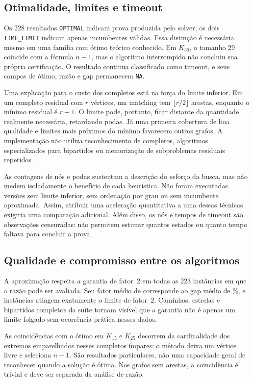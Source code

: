 \subsection{Otimalidade, limites e timeout}

Os 228 resultados \texttt{OPTIMAL} indicam prova produzida pelo
solver; os dois \texttt{TIME\_LIMIT} indicam apenas incumbentes
válidas. Essa distinção é necessária mesmo em uma família
com ótimo teórico conhecido. Em $K_{30}$, o tamanho 29
coincide com a fórmula $n-1$, mas o algoritmo interrompido
não concluiu sua própria certificação. O resultado continua
classificado como timeout, e seus campos de ótimo, razão e
gap permanecem \texttt{NA}.

Uma explicação para o custo dos completos está na força do
limite inferior. Em um completo residual com $r$ vértices,
um matching tem $\lfloor r/2\rfloor$ arestas, enquanto o
mínimo residual é $r-1$. O limite pode, portanto, ficar
distante da quantidade realmente necessária, retardando
podas. Já uma primeira cobertura de boa qualidade e limites
mais próximos do mínimo favorecem outros grafos.
A implementação não utiliza reconhecimento de completos,
algoritmos especializados para bipartidos ou memorização
de subproblemas residuais repetidos.

As contagens de nós e podas sustentam a descrição do esforço
da busca, mas não medem isoladamente o benefício de cada
heurística. Não foram executadas versões sem limite
inferior, sem ordenação por grau ou sem incumbente
aproximada. Assim, atribuir uma aceleração quantitativa
a uma dessas técnicas exigiria uma comparação adicional.
Além disso, os nós e tempos de timeout são observações
censuradas: não permitem estimar quantos estados ou quanto
tempo faltava para concluir a prova.

\subsection{Qualidade e compromisso entre os algoritmos}

A aproximação respeita a garantia de fator~2 em todas as
223 instâncias em que a razão pode ser avaliada.
Seu fator médio de \MeanRatio{} corresponde ao gap médio
de \MeanGap{}\%, e \FactorTwoInstances{} instâncias atingem
exatamente o limite de fator~2. Caminhos, estrelas e
bipartidos completos da suíte tornam visível que a garantia
não é apenas um limite folgado sem ocorrência prática
nesses dados.

As coincidências com o ótimo em $K_{15}$ e $K_{25}$
decorrem da cardinalidade dos extremos emparelhados nesses
completos ímpares: o método deixa um vértice livre e
seleciona $n-1$. São resultados particulares, não uma
capacidade geral de reconhecer quando a solução é ótima.
Nos grafos sem arestas, a coincidência é trivial e deve
ser separada da análise de razão.

